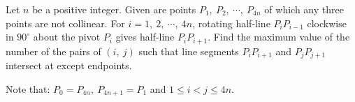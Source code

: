 Let $n$ be a positive integer. Given are points $P_1,\ P_2,\ \cdots,\ P_{4n}$ of which any three points are not collinear. For $i=1,\ 2,\ \cdots,\ 4n$, rotating half-line $P_iP_{i-1}$ clockwise in $90^\circ$ about the pivot  $P_i$ gives half-line $P_iP_{i+1}.$ Find the maximum value of the number of the pairs of $(i,\ j)$ such that line segments $P_iP_{i+1}$ and $P_jP_{j+1}$ intersect at except endpoints.

Note that: $P_0=P_{4n},\ P_{4n+1}=P_1$ and $1\leq i < j\leq 4n.$
